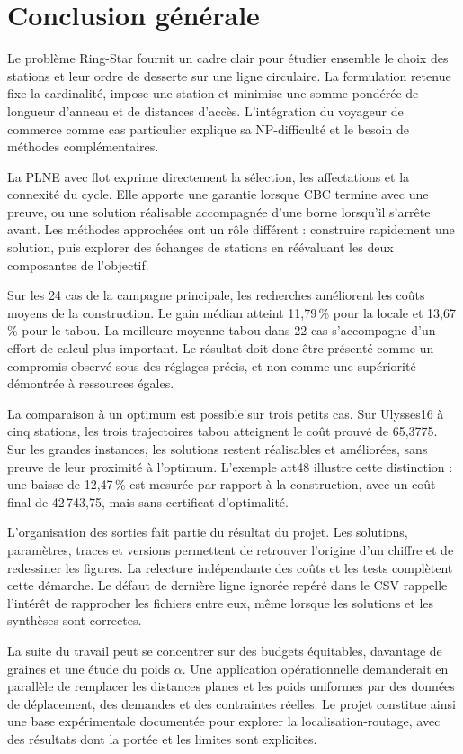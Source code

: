\chapter*{Conclusion générale}
Le problème Ring-Star fournit un cadre clair pour étudier ensemble le choix
des stations et leur ordre de desserte sur une ligne circulaire. La
formulation retenue fixe la cardinalité, impose une station et minimise
une somme pondérée de longueur d'anneau et de distances d'accès.
L'intégration du voyageur de commerce comme cas particulier explique sa
NP-difficulté et le besoin de méthodes complémentaires.

La PLNE avec flot exprime directement la sélection, les affectations et
la connexité du cycle. Elle apporte une garantie lorsque CBC termine avec
une preuve, ou une solution réalisable accompagnée d'une borne lorsqu'il
s'arrête avant. Les méthodes approchées ont un rôle différent : construire
rapidement une solution, puis explorer des échanges de stations en
réévaluant les deux composantes de l'objectif.

Sur les 24 cas de la campagne principale, les recherches améliorent les
coûts moyens de la construction. Le gain médian atteint 11,79\,\% pour
la locale et 13,67\,\% pour le tabou. La meilleure moyenne tabou dans
22 cas s'accompagne d'un effort de calcul plus important. Le résultat
doit donc être présenté comme un compromis observé sous des réglages
précis, et non comme une supériorité démontrée à ressources égales.

La comparaison à un optimum est possible sur trois petits cas. Sur
Ulysses16 à cinq stations, les trois trajectoires tabou atteignent le
coût prouvé de 65,3775. Sur les grandes instances, les solutions
restent réalisables et améliorées, sans preuve de leur proximité à
l'optimum. L'exemple att48 illustre cette distinction : une baisse de
12,47\,\% est mesurée par rapport à la construction, avec un coût final
de 42\,743,75, mais sans certificat d'optimalité.

L'organisation des sorties fait partie du résultat du projet. Les
solutions, paramètres, traces et versions permettent de retrouver
l'origine d'un chiffre et de redessiner les figures. La relecture
indépendante des coûts et les tests complètent cette démarche.
Le défaut de dernière ligne ignorée repéré dans le CSV rappelle
l'intérêt de rapprocher les fichiers entre eux, même lorsque les
solutions et les synthèses sont correctes.

La suite du travail peut se concentrer sur des budgets équitables,
davantage de graines et une étude du poids $\alpha$. Une application
opérationnelle demanderait en parallèle de remplacer les distances
planes et les poids uniformes par des données de déplacement,
des demandes et des contraintes réelles. Le projet constitue ainsi
une base expérimentale documentée pour explorer la localisation-routage,
avec des résultats dont la portée et les limites sont explicites.
